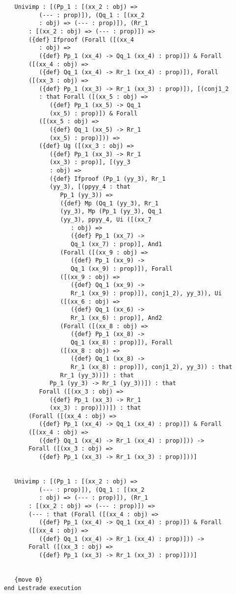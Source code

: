 \documentclass[12pt]{article}
\begin{document}
\begin{verbatim}
   Univimp : [(Pp_1 : [(xx_2 : obj) => 
          (--- : prop)]), (Qq_1 : [(xx_2 
          : obj) => (--- : prop)]), (Rr_1 
       : [(xx_2 : obj) => (--- : prop)]) => 
       ({def} Ifproof (Forall ([(xx_4 
          : obj) => 
          ({def} Pp_1 (xx_4) -> Qq_1 (xx_4) : prop)]) & Forall 
       ([(xx_4 : obj) => 
          ({def} Qq_1 (xx_4) -> Rr_1 (xx_4) : prop)]), Forall 
       ([(xx_3 : obj) => 
          ({def} Pp_1 (xx_3) -> Rr_1 (xx_3) : prop)]), [(conj1_2 
          : that Forall ([(xx_5 : obj) => 
             ({def} Pp_1 (xx_5) -> Qq_1 
             (xx_5) : prop)]) & Forall 
          ([(xx_5 : obj) => 
             ({def} Qq_1 (xx_5) -> Rr_1 
             (xx_5) : prop)])) => 
          ({def} Ug ([(xx_3 : obj) => 
             ({def} Pp_1 (xx_3) -> Rr_1 
             (xx_3) : prop)], [(yy_3 
             : obj) => 
             ({def} Ifproof (Pp_1 (yy_3), Rr_1 
             (yy_3), [(ppyy_4 : that 
                Pp_1 (yy_3)) => 
                ({def} Mp (Qq_1 (yy_3), Rr_1 
                (yy_3), Mp (Pp_1 (yy_3), Qq_1 
                (yy_3), ppyy_4, Ui ([(xx_7 
                   : obj) => 
                   ({def} Pp_1 (xx_7) -> 
                   Qq_1 (xx_7) : prop)], And1 
                (Forall ([(xx_9 : obj) => 
                   ({def} Pp_1 (xx_9) -> 
                   Qq_1 (xx_9) : prop)]), Forall 
                ([(xx_9 : obj) => 
                   ({def} Qq_1 (xx_9) -> 
                   Rr_1 (xx_9) : prop)]), conj1_2), yy_3)), Ui 
                ([(xx_6 : obj) => 
                   ({def} Qq_1 (xx_6) -> 
                   Rr_1 (xx_6) : prop)], And2 
                (Forall ([(xx_8 : obj) => 
                   ({def} Pp_1 (xx_8) -> 
                   Qq_1 (xx_8) : prop)]), Forall 
                ([(xx_8 : obj) => 
                   ({def} Qq_1 (xx_8) -> 
                   Rr_1 (xx_8) : prop)]), conj1_2), yy_3)) : that 
                Rr_1 (yy_3))]) : that 
             Pp_1 (yy_3) -> Rr_1 (yy_3))]) : that 
          Forall ([(xx_3 : obj) => 
             ({def} Pp_1 (xx_3) -> Rr_1 
             (xx_3) : prop)]))]) : that 
       (Forall ([(xx_4 : obj) => 
          ({def} Pp_1 (xx_4) -> Qq_1 (xx_4) : prop)]) & Forall 
       ([(xx_4 : obj) => 
          ({def} Qq_1 (xx_4) -> Rr_1 (xx_4) : prop)])) -> 
       Forall ([(xx_3 : obj) => 
          ({def} Pp_1 (xx_3) -> Rr_1 (xx_3) : prop)]))]


   Univimp : [(Pp_1 : [(xx_2 : obj) => 
          (--- : prop)]), (Qq_1 : [(xx_2 
          : obj) => (--- : prop)]), (Rr_1 
       : [(xx_2 : obj) => (--- : prop)]) => 
       (--- : that (Forall ([(xx_4 : obj) => 
          ({def} Pp_1 (xx_4) -> Qq_1 (xx_4) : prop)]) & Forall 
       ([(xx_4 : obj) => 
          ({def} Qq_1 (xx_4) -> Rr_1 (xx_4) : prop)])) -> 
       Forall ([(xx_3 : obj) => 
          ({def} Pp_1 (xx_3) -> Rr_1 (xx_3) : prop)]))]


   {move 0}
end Lestrade execution
\end{verbatim}
\end{document}
